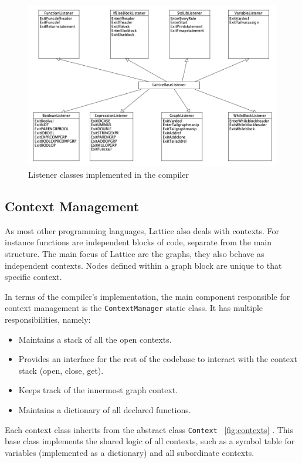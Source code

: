 \begin{figure}[H]
    \centering
    \includegraphics[width=12cm]{figures/implementation_section/listeners}
    \caption{Listener classes implemented in the compiler}
    \label{fig:listener_class_diagrams}
\end{figure}

\subsection{Context Management}
As most other programming languages, Lattice also deals with contexts.
For instance functions are independent blocks of code, separate from the main structure.
The main focus of Lattice are the graphs, they also behave as independent contexts.
Nodes defined within a graph block are unique to that specific context.

In terms of the compiler's implementation, the main component responsible for context management is the
\lstinline{ContextManager} static class.
It has multiple responsibilities, namely:

\begin{itemize}
    \item Maintains a stack of all the open contexts.
    \item Provides an interface for the rest of the codebase to interact with the context stack (open, close, get).
    \item Keeps track of the innermost graph context.
    \item Maintains a dictionary of all declared functions.
\end{itemize}

Each context class inherits from the abstract class \lstinline{Context} ~\ref{fig:contexts} .
This base class implements the shared logic of all contexts, such as a symbol table for variables (implemented as a dictionary)
and all subordinate contexts.

